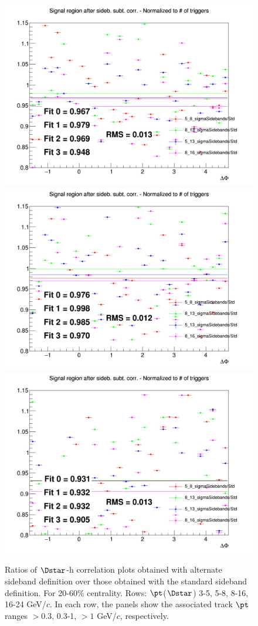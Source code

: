 \begin{figure}
{\includegraphics[width=0.31\linewidth]{figuresVsCent/Dstar/SystSideb/20_60/Ratio_AzimCorrDistr_Dstar_Canvas_PtIntBins10to10_PoolInt_thr03to99_Sideband_2060.png}}
{\includegraphics[width=0.31\linewidth]{figuresVsCent/Dstar/SystSideb/20_60/Ratio_AzimCorrDistr_Dstar_Canvas_PtIntBins10to10_PoolInt_thr03to1_Sideband_2060.png}}
{\includegraphics[width=0.31\linewidth]{figuresVsCent/Dstar/SystSideb/20_60/Ratio_AzimCorrDistr_Dstar_Canvas_PtIntBins10to10_PoolInt_thr1to99_Sideband_2060.png}} \\

 \caption{Ratios of $\Dstar$-h correlation plots obtained with alternate sideband definition over those obtained with the standard sideband definition. For 20-60\% centrality. Rows: $\pt$($\Dstar$) 3-5, 5-8, 8-16, 16-24 GeV/$c$. In each row, the panels show the associated track
$\pt$ ranges $> 0.3$, 0.3-1, $> 1$ GeV/$c$, respectively.}
\label{fig:SysBkg2060_Dstar}
\end{figure}


